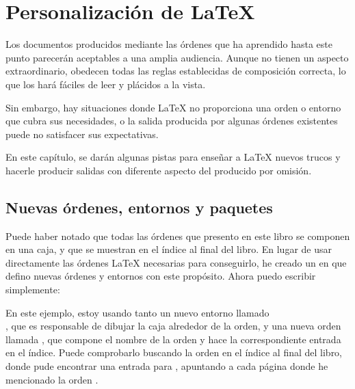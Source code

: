 \chapter{Personalización de \LaTeX}

\begin{intro}
Los documentos producidos mediante las órdenes que ha aprendido hasta este punto parecerán aceptables a una amplia audiencia.  Aunque no tienen un aspecto extraordinario, obedecen todas las reglas establecidas de composición correcta, lo que los hará fáciles de leer y plácidos a la vista.

Sin embargo, hay situaciones donde \LaTeX{} no proporciona una orden o entorno que cubra sus necesidades, o la salida producida por algunas órdenes existentes puede no satisfacer sus expectativas.

En este capítulo, se darán algunas pistas para enseñar a \LaTeX{} nuevos trucos y hacerle producir salidas con diferente aspecto del producido por omisión.
\end{intro}


\section{Nuevas órdenes, entornos y paquetes}

Puede haber notado que todas las órdenes que presento en este libro se componen en una caja, y que se muestran en el índice al final del libro.  En lugar de usar directamente las órdenes \LaTeX{} necesarias para conseguirlo, he creado un  en que defino nuevas órdenes y entornos con este propósito.  Ahora puedo escribir simplemente:

\begin{example}
\begin{lscommand}
\end{lscommand}
\end{example}

En este ejemplo, estoy usando tanto un nuevo entorno llamado\\ , que es responsable de dibujar la caja alrededor de la orden, y una nueva orden llamada , que compone el nombre de la orden y hace la correspondiente entrada en el índice.  Puede comprobarlo buscando la orden  en el índice al final del libro, donde pude encontrar una entrada para , apuntando a cada página donde he mencionado la orden .

